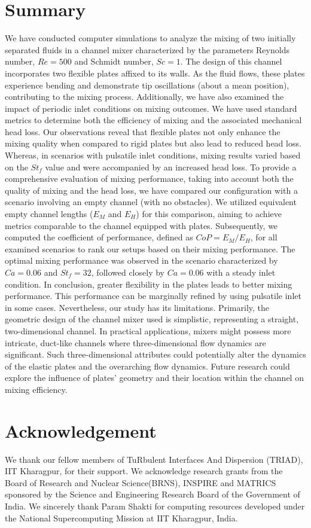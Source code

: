 \documentclass[%
 aip,
 amsmath,amssymb,
 reprint,
]{revtex4-1}
\begin{document}
\section{Summary}
We have conducted computer simulations to analyze the mixing of two initially separated fluids in a channel mixer characterized by the parameters Reynolds number, $Re=500$ and Schmidt number, $Sc=1$. The design of this channel incorporates two flexible plates affixed to its walls. As the fluid flows, these plates experience bending and demonstrate tip oscillations (about a mean position), contributing to the mixing process. Additionally, we have also examined the impact of periodic inlet conditions on mixing outcomes. We have used standard metrics to determine both the efficiency of mixing and the associated mechanical head loss. Our observations reveal that flexible plates not only enhance the mixing quality when compared to rigid plates but also lead to reduced head loss. Whereas, in scenarios with pulsatile inlet conditions, mixing results varied based on the $St_f$ value and were accompanied by an increased head loss. To provide a comprehensive evaluation of mixing performance, taking into account both the quality of mixing and the head loss, we have compared our configuration with a scenario involving an empty channel (with no obstacles). We utilized equivalent empty channel lengths ($E_M$ and $E_H$) for this comparison, aiming to achieve metrics comparable to the channel equipped with plates. Subsequently, we computed the coefficient of performance, defined as $CoP=E_M/E_H$, for all examined scenarios to rank our setups based on their mixing performance. The optimal mixing performance was observed in the scenario characterized by $Ca=0.06$ and $St_f=32$, followed closely by $Ca=0.06$ with a steady inlet condition. In conclusion, greater flexibility in the plates leads to better mixing performance. This performance can be marginally refined by using pulsatile inlet in some cases.
Nevertheless, our study has its limitations. Primarily, the geometric design of the channel mixer used is simplistic, representing a straight, two-dimensional channel. In practical applications, mixers might possess more intricate, duct-like channels where three-dimensional flow dynamics are significant. Such three-dimensional attributes could potentially alter the dynamics of the elastic plates and the overarching flow dynamics. Future research could explore the influence of plates' geometry and their location within the channel on mixing efficiency.


\section{Acknowledgement}
We thank our fellow members of TuRbulent Interfaces And Dispersion (TRIAD), IIT Kharagpur, for their support. We acknowledge research grants from the Board of Research and Nuclear Science(BRNS), INSPIRE and MATRICS sponsored by the Science and Engineering Research Board of the Government of India. We sincerely thank Param Shakti for computing resources developed under the National Supercomputing Mission at IIT Kharagpur, India.
\end{document}
